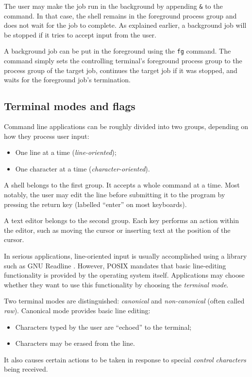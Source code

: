 \documentclass[shortabstract, manyadvisors, english, mgr]{iithesis}
\begin{document}
The user may make the job run in the background by appending \texttt{\&} to the
command. In that case, the shell remains in the foreground process group and
does not wait for the job to complete. As explained earlier, a background job
will be stopped if it tries to accept input from the user.

A background job can be put in the foreground using the \texttt{fg} command. The
command simply sets the controlling terminal's foreground process group to the
process group of the target job, continues the target job if it was stopped, and
waits for the foreground job's termination.

\subsection{Terminal modes and flags}

Command line applications can be roughly divided into two groups, depending on
how they process user input:
\begin{itemize}
  \item{One line at a time (\textit{line-oriented});}
  \item{One character at a time (\textit{character-oriented}).}
\end{itemize}

A shell belongs to the first group. It accepts a whole command at a time. Most
notably, the user may edit the line before submitting it to the program by
pressing the return key (labelled ``enter'' on most keyboards).

A text editor belongs to the second group. Each key performs an action within
the editor, such as moving the cursor or inserting text at the position of the
cursor.

In serious applications, line-oriented input is usually accomplished using a
library such as GNU Readline \cite{readline}. However, POSIX mandates that basic
line-editing functionality is provided by the operating system itself.
Applications may choose whether they want to use this functionality by choosing
the \textit{terminal mode}.

Two terminal modes are distinguished: \textit{canonical} and
\textit{non-canonical} (often called \textit{raw}). Canonical mode provides
basic line editing:
\begin{itemize}
  \item{Characters typed by the user are ``echoed'' to the terminal;}
  \item{Characters may be erased from the line.}
\end{itemize}
It also causes certain actions to be taken in response to special
\textit{control characters} being received.
\end{document}
